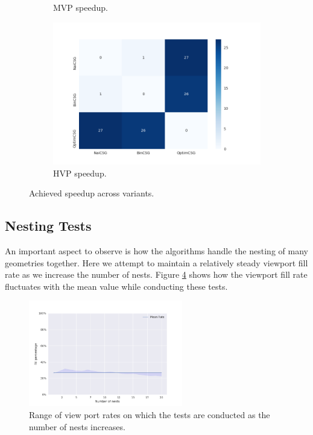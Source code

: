\documentclass[a4paper,11pt,oneside]{article}
\begin{document}
\begin{figure}[ht]
\begin{subfigure}[b]{0.3\textwidth}
		\caption{MVP speedup.}
		\label{sec5:speedup-mvp}
	\end{subfigure}
	\begin{subfigure}[b]{0.3\textwidth}
		\centering
		\includegraphics[width=\linewidth]{section5/plots/speedup_hvp.png}
		\caption{HVP speedup.}
		\label{sec5:speedup-hvp}
	\end{subfigure}
	\caption{Achieved speedup across variants.}
	\label{sec5:speedup}
\end{figure}


\subsection{Nesting Tests}

An important aspect to observe is how the algorithms handle the nesting of many geometries together. Here we attempt to maintain a relatively steady viewport fill rate as we increase the number of nests. Figure \ref{sec5.2:test_nesting_rates} shows how the viewport fill rate fluctuates with the mean value while conducting these tests.

\begin{figure}[H]
	\centering
	\includegraphics[width=0.6\textwidth]{section5/plots/test_nesting_rates.png}
	\caption{Range of view port rates on which the tests are conducted as the number of nests increases.}
	\label{sec5.2:test_nesting_rates}
\end{figure}
\end{document}
